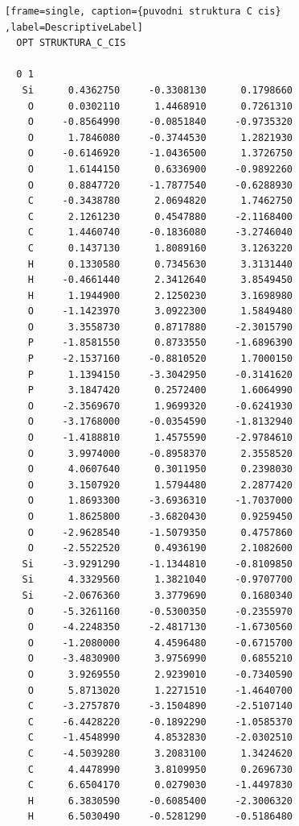 \documentclass[
  digital, %
  table,   %
  lof,     %
  lot,     %
  oneside,
]{fithesis3}
\begin{document}
  \begin{lstlisting}[frame=single, caption={puvodni struktura C cis} ,label=DescriptiveLabel]
  OPT STRUKTURA_C_CIS

  0 1
   Si      0.4362750     -0.3308130      0.1798660
    O      0.0302110      1.4468910      0.7261310
    O     -0.8564990     -0.0851840     -0.9735320
    O      1.7846080     -0.3744530      1.2821930
    O     -0.6146920     -1.0436500      1.3726750
    O      1.6144150      0.6336900     -0.9892260
    O      0.8847720     -1.7877540     -0.6288930
    C     -0.3438780      2.0694820      1.7462750
    C      2.1261230      0.4547880     -2.1168400
    C      1.4460740     -0.1836080     -3.2746040
    C      0.1437130      1.8089160      3.1263220
    H      0.1330580      0.7345630      3.3131440
    H     -0.4661440      2.3412640      3.8549450
    H      1.1944900      2.1250230      3.1698980
    O     -1.1423970      3.0922300      1.5849480
    O      3.3558730      0.8717880     -2.3015790
    P     -1.8581550      0.8733550     -1.6896390
    P     -2.1537160     -0.8810520      1.7000150
    P      1.1394150     -3.3042950     -0.3141620
    P      3.1847420      0.2572400      1.6064990
    O     -2.3569670      1.9699320     -0.6241930
    O     -3.1768000     -0.0354590     -1.8132940
    O     -1.4188810      1.4575590     -2.9784610
    O      3.9974000     -0.8958370      2.3558520
    O      4.0607640      0.3011950      0.2398030
    O      3.1507920      1.5794480      2.2877420
    O      1.8693300     -3.6936310     -1.7037000
    O      1.8625800     -3.6820430      0.9259450
    O     -2.9628540     -1.5079350      0.4757860
    O     -2.5522520      0.4936190      2.1082600
   Si     -3.9291290     -1.1344810     -0.8109850
   Si      4.3329560      1.3821040     -0.9707700
   Si     -2.0676360      3.3779690      0.1680340
    O     -5.3261160     -0.5300350     -0.2355970
    O     -4.2248350     -2.4817130     -1.6730560
    O     -1.2080000      4.4596480     -0.6715700
    O     -3.4830900      3.9756990      0.6855210
    O      3.9269550      2.9239010     -0.7340590
    O      5.8713020      1.2271510     -1.4640700
    C     -3.2757870     -3.1504890     -2.5107140
    C     -6.4428220     -0.1892290     -1.0585370
    C     -1.4548990      4.8532830     -2.0302510
    C     -4.5039280      3.2083100      1.3424620
    C      4.4478990      3.8109950      0.2696730
    C      6.6504170      0.0279030     -1.4497830
    H      6.3830590     -0.6085400     -2.3006320
    H      6.5030490     -0.5281290     -0.5186480

\end{lstlisting}
\end{document}
